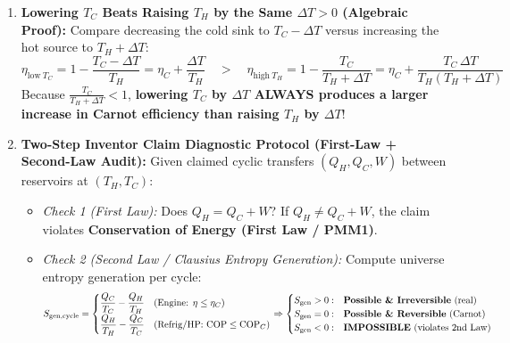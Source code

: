 \begin{formulacard}
\begin{enumerate}
  \item \textbf{Lowering $T_C$ Beats Raising $T_H$ by the Same $\Delta T > 0$ (Algebraic Proof):}
  Compare decreasing the cold sink to $T_C - \Delta T$ versus increasing the hot source to $T_H + \Delta T$:
  \begin{equation}\label{eq:09:carnot-sensitivity}
    \eta_{\mathrm{low\ }T_C} = 1 - \frac{T_C - \Delta T}{T_H} = \eta_C + \frac{\Delta T}{T_H} \quad > \quad \eta_{\mathrm{high\ }T_H} = 1 - \frac{T_C}{T_H + \Delta T} = \eta_C + \frac{T_C\,\Delta T}{T_H(T_H + \Delta T)}
  \end{equation}
  Because $\frac{T_C}{T_H + \Delta T} < 1$, \textbf{lowering $T_C$ by $\Delta T$ ALWAYS produces a larger increase in Carnot efficiency than raising $T_H$ by $\Delta T$}!
  \item \textbf{Two-Step Inventor Claim Diagnostic Protocol (First-Law + Second-Law Audit):}
  Given claimed cyclic transfers $(Q_H, Q_C, W)$ between reservoirs at $(T_H, T_C)$:
  \begin{itemize}
    \item \emph{Check 1 (First Law):} Does $Q_H = Q_C + W$? If $Q_H \ne Q_C + W$, the claim violates \textbf{Conservation of Energy (First Law / PMM1)}.
    \item \emph{Check 2 (Second Law / Clausius Entropy Generation):} Compute universe entropy generation per cycle:
    {\footnotesize\begin{equation}\label{eq:09:claim-audit}
      S_{\mathrm{gen,cycle}} = \begin{cases} \dfrac{Q_C}{T_C} - \dfrac{Q_H}{T_H} & \text{(Engine: } \eta \le \eta_C\text{)}\\[5pt] \dfrac{Q_H}{T_H} - \dfrac{Q_C}{T_C} & \text{(Refrig/HP: } \mathrm{COP} \le \mathrm{COP}_C\text{)} \end{cases} \Rightarrow \begin{cases} S_{\mathrm{gen}} > 0: & \text{\textbf{Possible \& Irreversible} (real)}\\ S_{\mathrm{gen}} = 0: & \text{\textbf{Possible \& Reversible} (Carnot)}\\ S_{\mathrm{gen}} < 0: & \text{\textbf{IMPOSSIBLE} (violates 2nd Law)} \end{cases}

\end{equation}}
\end{itemize}
\end{enumerate}
\end{formulacard}
